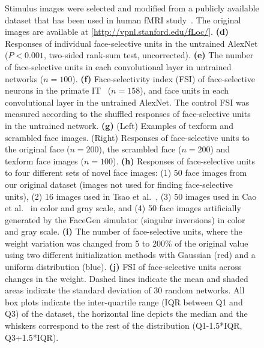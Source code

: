 \documentclass[sn-mathphys-num]{sn-jnl}%
\theoremstyle{thmstyleone}%
\theoremstyle{thmstyletwo}%
\theoremstyle{thmstylethree}%
\begin{document}
\begin{figure}[!htb]
{		Stimulus images were selected and modified from a publicly available dataset that has been used in human fMRI study~\cite{stigliani2015temporal}.
		The original images are available at [\url{http://vpnl.stanford.edu/fLoc/}].
		\textbf{(d)} Responses of individual face-selective units in the untrained AlexNet ($ P < 0.001 $, two-sided rank-sum test, uncorrected).
		\textbf{(e)} The number of face-selective units in each convolutional layer in untrained networks ($ n=100 $).
		\textbf{(f)} Face-selectivity index (FSI) of face-selective neurons in the primate IT~\cite{freiwald2010functional} ($ n=158 $), and face units in each convolutional layer in the untrained AlexNet.
		The control FSI was measured according to the shuffled responses of face-selective units in the untrained network.
		\textbf{(g)} (Left) Examples of texform and scrambled face images.
		(Right) Responses of face-selective units to the original face ($ n = 200 $), the scrambled face ($ n=200 $) and texform face images ($ n = 100 $).
		\textbf{(h)} Responses of face-selective units to four different sets of novel face images: 
		(1) 50 face images from our original dataset (images not used for finding face-selective units),
		(2) 16 images used in Tsao et al.~\cite{tsao2006cortical,freiwald2010functional},
		(3) 50 images used in Cao et al.~\cite{cao2018vggface2} in color and gray scale,
		and (4) 50 face images artificially generated by the FaceGen simulator (singular inversions) in color and gray scale. %
		\textbf{(i)} The number of face-selective units, where the weight variation was changed from 5 to 200\% of the original value using two different initialization methods with Gaussian (red) and a uniform distribution (blue).
		\textbf{(j)} FSI of face-selective units across changes in the weight.
		Dashed lines indicate the mean and shaded areas indicate the standard deviation of 30 random networks.
		All box plots indicate the inter-quartile range (IQR between Q1 and Q3) of the dataset,
		the horizontal line depicts the median and the whiskers correspond to the rest of the distribution (Q1-1.5*IQR, Q3+1.5*IQR).
	} \label{fig:emergence}
\end{figure}
\end{document}
